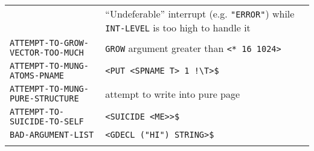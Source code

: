 \documentclass[a4paper]{scrbook}
\begin{document}
\begin{longtable}[]{@{}ll@{}}
\begin{minipage}[t]{0.58\columnwidth}
\end{minipage} & \begin{minipage}[t]{0.36\columnwidth}\raggedright\strut
``Undeferable'' interrupt (e.g. \texttt{"ERROR"}) while \texttt{INT-LEVEL} is too high to handle it\strut
\end{minipage}\tabularnewline
\begin{minipage}[t]{0.58\columnwidth}\raggedright\strut
\texttt{ATTEMPT-TO-GROW-VECTOR-TOO-MUCH}\strut
\end{minipage} & \begin{minipage}[t]{0.36\columnwidth}\raggedright\strut
\texttt{GROW} argument greater than \texttt{\textless{}*\ 16\ 1024\textgreater{}}\strut
\end{minipage}\tabularnewline
\begin{minipage}[t]{0.58\columnwidth}\raggedright\strut
\texttt{ATTEMPT-TO-MUNG-ATOMS-PNAME}\strut
\end{minipage} & \begin{minipage}[t]{0.36\columnwidth}\raggedright\strut
\texttt{\textless{}PUT\ \textless{}SPNAME\ T\textgreater{}\ 1\ !\textbackslash{}T\textgreater{}\$}\strut
\end{minipage}\tabularnewline
\begin{minipage}[t]{0.58\columnwidth}\raggedright\strut
\texttt{ATTEMPT-TO-MUNG-PURE-STRUCTURE}\strut
\end{minipage} & \begin{minipage}[t]{0.36\columnwidth}\raggedright\strut
attempt to write into pure page\strut
\end{minipage}\tabularnewline
\begin{minipage}[t]{0.58\columnwidth}\raggedright\strut
\texttt{ATTEMPT-TO-SUICIDE-TO-SELF}\strut
\end{minipage} & \begin{minipage}[t]{0.36\columnwidth}\raggedright\strut
\texttt{\textless{}SUICIDE\ \textless{}ME\textgreater{}\textgreater{}\$}\strut
\end{minipage}\tabularnewline
\begin{minipage}[t]{0.58\columnwidth}\raggedright\strut
\texttt{BAD-ARGUMENT-LIST}\strut
\end{minipage} & \begin{minipage}[t]{0.36\columnwidth}\raggedright\strut
\texttt{\textless{}GDECL\ ("HI")\ STRING\textgreater{}\$}\strut
\end{minipage}\tabularnewline
\begin{minipage}[t]{0.58\columnwidth}\raggedright\strut

\end{minipage}
\end{longtable}
\end{document}

